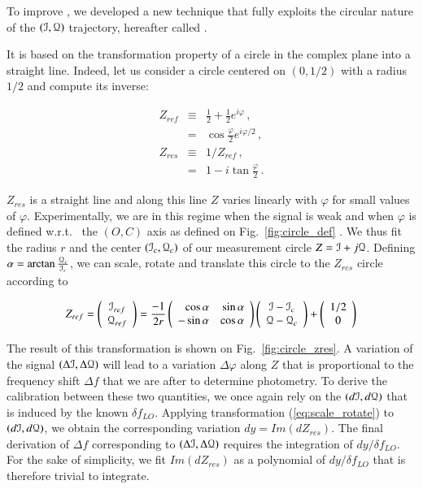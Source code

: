 To improve \rf, we developed a new technique that fully exploits the circular
nature of the $(\mathcal{I},\mathcal{Q})$ trajectory, hereafter called \cf. {\color{blue} It is
  based on the transformation property of a circle in the complex plane into a
  straight line. Indeed, let us consider a circle centered on $(0,1/2)$ with a
  radius $1/2$ and compute its inverse:

\begin{eqnarray}
Z_{ref} &\equiv&\frac{1}{2} + \frac{1}{2}e^{i\varphi}\,, \\
&=&\cos\frac{\varphi}{2}e^{i\varphi/2}\,,\\
Z_{res} &\equiv& 1/Z_{ref}\,, \label{eq:z_res} \\
&=&1-i\tan\frac{\varphi}{2}\,.
\end{eqnarray}

$Z_{res}$ is a straight line and along this line $Z$ varies linearly with
$\varphi$ for small values of $\varphi$. Experimentally, we are in this regime
when the signal is weak and when $\varphi$ is defined w.r.t.~ the $(O,C)$ axis
as defined on Fig.~\ref{fig:circle_def} . We thus fit the radius $r$ and the
center $(\mathcal{I}_c,\mathcal{Q}_c)$ of our measurement circle $Z=\mathcal{I}+j\mathcal{Q}$. Defining
$\alpha=\arctan\frac{\mathcal{Q}_c}{\mathcal{I}_c}$, we can scale, rotate and translate this
circle to the $Z_{res}$ circle according to

\begin{equation}
Z_{ref} = \left(\begin{array}{c}
\mathcal{I}_{ref}\\
\mathcal{Q}_{ref}\end{array}\right) = 
\frac{-1}{2r}\left(\begin{array}{rr}
\cos\alpha & \sin\alpha\\
-\sin\alpha & \cos\alpha\end{array}\right)
\left(\begin{array}{c}
\mathcal{I}-\mathcal{I}_c\\
\mathcal{Q}-\mathcal{Q}_c\end{array}\right) +
\left(\begin{array}{c}
1/2\\
0\end{array}\right)
\label{eq:scale_rotate}
\end{equation}

The result of this transformation is shown on Fig.~\ref{fig:circle_zres}. A
variation of the signal $(\Delta\mathcal{I},\Delta\mathcal{Q})$ will lead to a variation
$\Delta\varphi$ along $Z$ that is proportional to the frequency shift $\Delta f$
that we are after to determine photometry. To derive the calibration between
these two quantities, we once again rely on the $(d\mathcal{I},d\mathcal{Q})$ that is induced by
the known $\delta f_{LO}$. Applying transformation (\ref{eq:scale_rotate}) to
$(d\mathcal{I},d\mathcal{Q})$, we obtain the corresponding variation $dy = Im(dZ_{res})$. The
final derivation of $\Delta f$ corresponding to $(\Delta\mathcal{I},\Delta\mathcal{Q})$ requires
the integration of $dy/\delta f_{LO}$. For the sake of simplicity, we fit
$Im(dZ_{res})$ as a polynomial of $dy/\delta f_{LO}$ that is therefore trivial
to integrate.

}
